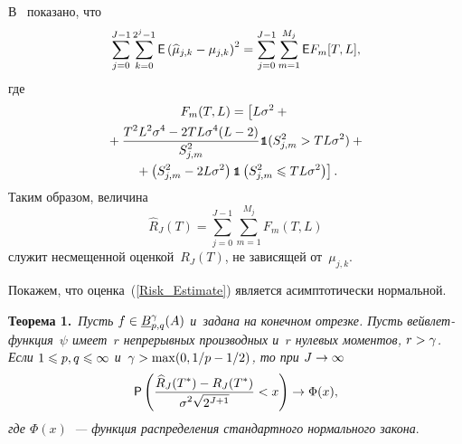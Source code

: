 \begin{multicols}{2}
В~\cite{Cai99} показано, что
\begin{equation*}
\sum\limits_{j=0}^{J-1}\sum\limits_{k=0}^{2^j-1}{\sf E}\left(\widehat{\mu}_{j,k}-
\mu_{j,k}\right)^2=\sum\limits_{j=0}^{J-1}\sum\limits_{m=1}^{M_j}{\sf E} F_m[T,L],
\end{equation*}
где
\begin{multline*}
F_m(T,L)=\left[
L\sigma^2+{}\right.\\
{}+\displaystyle\frac{\displaystyle T^2L^2\sigma^4-2TL\sigma^4(L-2)\mathstrut}{\displaystyle S_{j,m}^2\mathstrut}
\mbox{{\small \tt {1}}\hspace{-1.3mm}{\tt 1}}(S^2_{j,m}>TL\sigma^2)+{}\\
\left.{}+\left(S^2_{j,m}-2L\sigma^2\right)\mbox{{\small \tt {1}}\hspace{-1.3mm}{\tt 1}}
\left(S^2_{j,m}\leqslant TL\sigma^2\right)\right].
\end{multline*}
Таким образом, величина
\begin{equation}
\label{Risk_Estimate}
\widehat{R}_J(T)=\sum\limits_{j=0}^{J-1}\sum\limits_{m=1}^{M_j} F_m(T,L)
\end{equation}
служит несмещенной оценкой~$R_J(T)$, не зависящей от~$\mu_{j,k}$.


Покажем, что оценка~(\ref{Risk_Estimate}) является асимптотически нормальной.

\smallskip

\noindent
\textbf{Теорема 1.}\ \textit{Пусть $f\in \emph{B}^{\gamma}_{p,q}(A)$ и~задана на конечном отрезке.
 Пусть вейв\-лет-функ\-ция~$\psi$ имеет~$r$ непрерывных производных и~$r$ нулевых моментов, 
 $r\hm>\gamma$. Если $1\hm\leqslant p,q\hm\leqslant\infty$ и~$\gamma\hm>\max(0,1/p-1/2)$, то при} $J\hm\to\infty$
\begin{equation}\label{Normality}
{\sf P}\left(\displaystyle\frac{\displaystyle \widehat{R}_J(T^*)-R_J(T^*)\mathstrut}{\displaystyle \sigma^2\sqrt{2^{J+1}}\mathstrut}<x\right)\to\Phi(x),
\end{equation}
\textit{где $\Phi(x)$~--- функция распределения стандартного нормального закона}.

\smallskip


\end{multicols}
